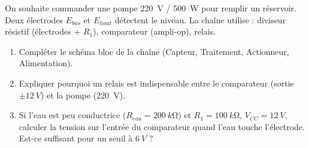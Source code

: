 \documentclass[11pt]{article}
\begin{document}
\begin{exercice}
On souhaite commander une pompe \SI{220}{V} / \SI{500}{W} pour remplir un réservoir. Deux électrodes $E_{bas}$ et $E_{haut}$ détectent le niveau. La chaîne utilise : diviseur résistif (électrodes + $R_1$), comparateur (ampli-op), relais.
\begin{enumerate}
\item Compléter le schéma bloc de la chaîne (Capteur, Traitement, Actionneur, Alimentation).
\item Expliquer pourquoi un relais est indispensable entre le comparateur (sortie $\pm \SI{12}{V}$) et la pompe (\SI{220}{V}).
\item Si l'eau est peu conductrice ($R_{eau} = \SI{200}{k\ohm}$) et $R_1 = \SI{100}{k\ohm}$, $V_{CC}=\SI{12}{V}$, calculer la tension sur l'entrée du comparateur quand l'eau touche l'électrode. Est-ce suffisant pour un seuil à $\SI{6}{V}$ ?
\end{enumerate}
\end{exercice}
\end{document}
